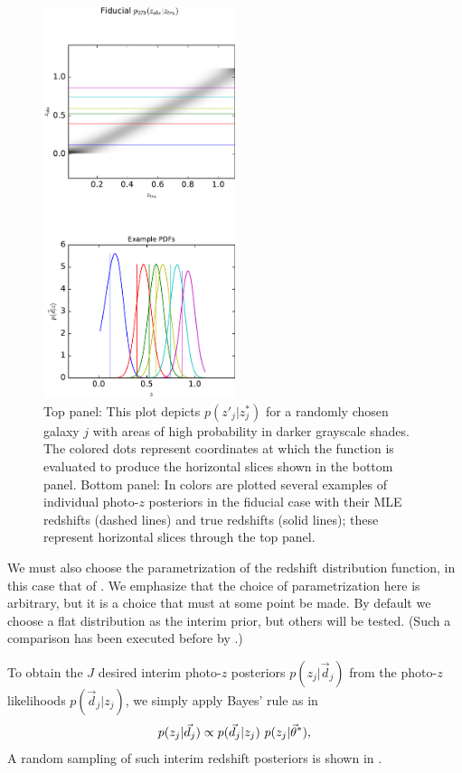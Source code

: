 \begin{figure}
	\includegraphics[width=0.5\textwidth]{figures/chippr/sig2_zobsvztru.pdf}
	\caption{Top panel: This plot depicts $p(z'_{j}|z^{*}_{j})$ for a randomly chosen galaxy $j$ with areas of high probability in darker grayscale shades.  
		The colored dots represent coordinates at which the function is evaluated to produce the horizontal slices shown in the bottom panel.  
		Bottom panel: In colors are plotted several examples of individual photo-$z$ posteriors in the fiducial case with their MLE redshifts (dashed lines) and true redshifts (solid lines); these represent horizontal slices through the top panel.}
\end{figure}

We must also choose the parametrization of the redshift distribution function, in this case that of .   
We emphasize that the choice of parametrization here is arbitrary, but it is a choice that must at some point be made.  
By default we choose a flat distribution as the interim prior, but others will be tested.  
(Such a comparison has been executed before by \citet{Viironen2015}.)

To obtain the $J$ desired interim photo-$z$ posteriors $p(z_{j}|\vec{d}_{j})$ from the photo-$z$ likelihoods $p(\vec{d}_{j}|z_{j})$, we simply apply Bayes' rule as in 
\begin{equation}
\eqlabel{eq:likpost}
p(z_{j}|\vec{d}_{j}) \propto p(\vec{d}_{j}|z_{j})\ p(z_{j}|\vec{\theta}^{*}),
\end{equation}
A random sampling of such interim redshift posteriors is shown in .  

